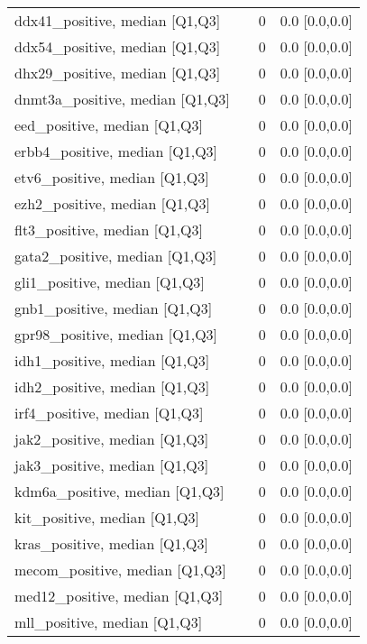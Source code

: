 \begin{tabular}{llll}
ddx41\_positive, median [Q1,Q3] &    &      0 &     0.0 [0.0,0.0] \\
ddx54\_positive, median [Q1,Q3] &    &      0 &     0.0 [0.0,0.0] \\
dhx29\_positive, median [Q1,Q3] &    &      0 &     0.0 [0.0,0.0] \\
dnmt3a\_positive, median [Q1,Q3] &    &      0 &     0.0 [0.0,0.0] \\
eed\_positive, median [Q1,Q3] &    &      0 &     0.0 [0.0,0.0] \\
erbb4\_positive, median [Q1,Q3] &    &      0 &     0.0 [0.0,0.0] \\
etv6\_positive, median [Q1,Q3] &    &      0 &     0.0 [0.0,0.0] \\
ezh2\_positive, median [Q1,Q3] &    &      0 &     0.0 [0.0,0.0] \\
flt3\_positive, median [Q1,Q3] &    &      0 &     0.0 [0.0,0.0] \\
gata2\_positive, median [Q1,Q3] &    &      0 &     0.0 [0.0,0.0] \\
gli1\_positive, median [Q1,Q3] &    &      0 &     0.0 [0.0,0.0] \\
gnb1\_positive, median [Q1,Q3] &    &      0 &     0.0 [0.0,0.0] \\
gpr98\_positive, median [Q1,Q3] &    &      0 &     0.0 [0.0,0.0] \\
idh1\_positive, median [Q1,Q3] &    &      0 &     0.0 [0.0,0.0] \\
idh2\_positive, median [Q1,Q3] &    &      0 &     0.0 [0.0,0.0] \\
irf4\_positive, median [Q1,Q3] &    &      0 &     0.0 [0.0,0.0] \\
jak2\_positive, median [Q1,Q3] &    &      0 &     0.0 [0.0,0.0] \\
jak3\_positive, median [Q1,Q3] &    &      0 &     0.0 [0.0,0.0] \\
kdm6a\_positive, median [Q1,Q3] &    &      0 &     0.0 [0.0,0.0] \\
kit\_positive, median [Q1,Q3] &    &      0 &     0.0 [0.0,0.0] \\
kras\_positive, median [Q1,Q3] &    &      0 &     0.0 [0.0,0.0] \\
mecom\_positive, median [Q1,Q3] &    &      0 &     0.0 [0.0,0.0] \\
med12\_positive, median [Q1,Q3] &    &      0 &     0.0 [0.0,0.0] \\
mll\_positive, median [Q1,Q3] &    &      0 &     0.0 [0.0,0.0] \\

\end{tabular}
